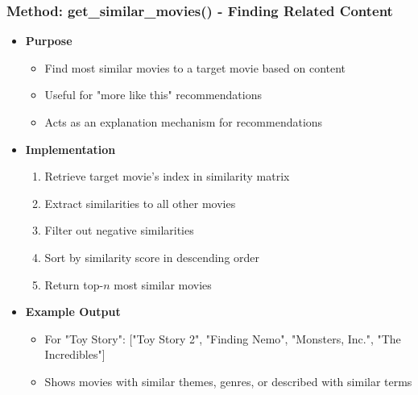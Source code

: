 \documentclass{beamer}
\begin{document}
\begin{frame}
\frametitle{Method: get\_similar\_movies() - Finding Related Content}

\begin{itemize}
    \item \textbf{Purpose}
    \begin{itemize}
        \item Find most similar movies to a target movie based on content
        \item Useful for "more like this" recommendations
        \item Acts as an explanation mechanism for recommendations
    \end{itemize}
    
    \vspace{0.5cm}
    
    \item \textbf{Implementation}
    \begin{enumerate}
        \item Retrieve target movie's index in similarity matrix
        \item Extract similarities to all other movies
        \item Filter out negative similarities
        \item Sort by similarity score in descending order
        \item Return top-$n$ most similar movies
    \end{enumerate}
    
    \vspace{0.5cm}
    
    \item \textbf{Example Output}
    \begin{itemize}
        \item For "Toy Story": ["Toy Story 2", "Finding Nemo", "Monsters, Inc.", "The Incredibles"]
        \item Shows movies with similar themes, genres, or described with similar terms
    \end{itemize}
\end{itemize}
\end{frame}
\end{document}
